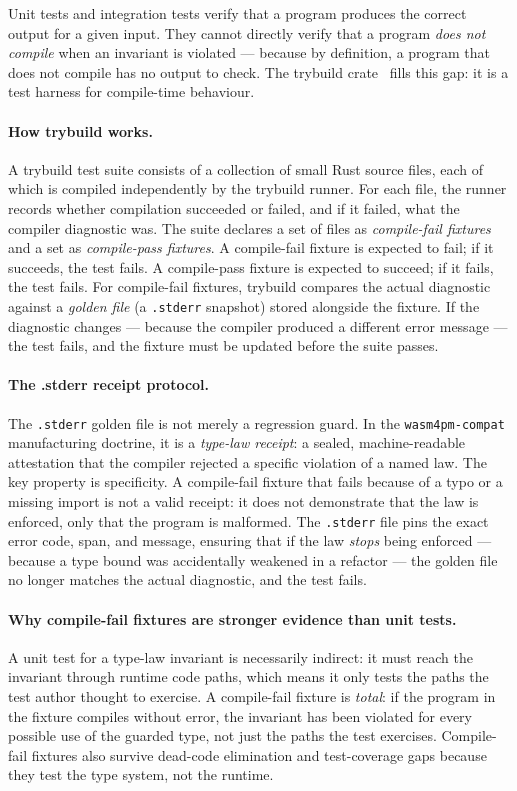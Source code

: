 Unit tests and integration tests verify that a program produces the correct
output for a given input. They cannot directly verify that a program \emph{does
not compile} when an invariant is violated --- because by definition, a program
that does not compile has no output to check. The trybuild
crate~\cite{tolnay2019trybuild} fills this gap: it is a test harness for
compile-time behaviour.

\paragraph{How trybuild works.}
A trybuild test suite consists of a collection of small Rust source files,
each of which is compiled independently by the trybuild runner. For each file,
the runner records whether compilation succeeded or failed, and if it failed,
what the compiler diagnostic was. The suite declares a set of files as
\emph{compile-fail fixtures} and a set as \emph{compile-pass fixtures}.
A compile-fail fixture is expected to fail; if it succeeds, the test fails.
A compile-pass fixture is expected to succeed; if it fails, the test fails.
For compile-fail fixtures, trybuild compares the actual diagnostic against a
\emph{golden file} (a \texttt{.stderr} snapshot) stored alongside the fixture.
If the diagnostic changes --- because the compiler produced a different error
message --- the test fails, and the fixture must be updated before the suite
passes.

\paragraph{The .stderr receipt protocol.}
The \texttt{.stderr} golden file is not merely a regression guard.
In the \texttt{wasm4pm-compat} manufacturing doctrine, it is a
\emph{type-law receipt}: a sealed, machine-readable attestation that the
compiler rejected a specific violation of a named law. The key property is
specificity. A compile-fail fixture that fails because of a typo or a missing
import is not a valid receipt: it does not demonstrate that the law is enforced,
only that the program is malformed. The \texttt{.stderr} file pins the exact
error code, span, and message, ensuring that if the law \emph{stops} being
enforced --- because a type bound was accidentally weakened in a refactor --- the
golden file no longer matches the actual diagnostic, and the test fails.

\paragraph{Why compile-fail fixtures are stronger evidence than unit tests.}
A unit test for a type-law invariant is necessarily indirect: it must reach
the invariant through runtime code paths, which means it only tests the paths
the test author thought to exercise. A compile-fail fixture is \emph{total}:
if the program in the fixture compiles without error, the invariant has been
violated for every possible use of the guarded type, not just the paths
the test exercises. Compile-fail fixtures also survive dead-code elimination
and test-coverage gaps because they test the type system, not the runtime.

